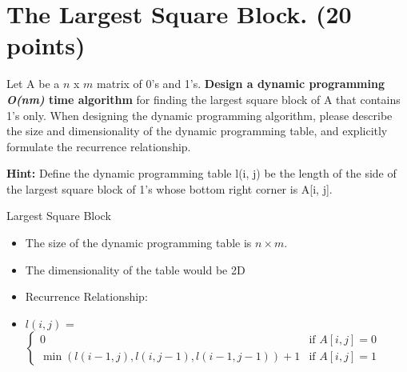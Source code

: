 \documentclass{article}[12pt]
\begin{document}
\pagebreak

\section{The Largest Square Block. (20 points)}
Let A be a $n$ x $m$ matrix of 0's and 1's. 
\textbf{Design a dynamic programming \textit{O(nm)} time algorithm} for 
finding the largest square block of A that contains 1's only. 
When designing the dynamic programming algorithm, please describe the size and dimensionality 
of the dynamic programming table, and explicitly formulate the recurrence relationship. 


\noindent\textbf{Hint:} Define the dynamic programming table l(i, j) be the length of the side of the largest square block of 1's whose bottom right corner is A[i, j].


\begin{algorithm}[H]
\caption{Largest Square Block}

\end{algorithm}

\begin{itemize}
  \item The size of the dynamic programming table is $n \times m$.
  \item The dimensionality of the table would be 2D
  \item Recurrence Relationship:
  \item $l(i, j)$ = $\begin{cases}
    0 & \text{if } A[i, j] = 0 \\
    \min(l(i-1, j), l(i, j-1), l(i-1, j-1)) + 1 & \text{if } A[i, j] = 1
  \end{cases}$
\end{itemize}
\end{document}

